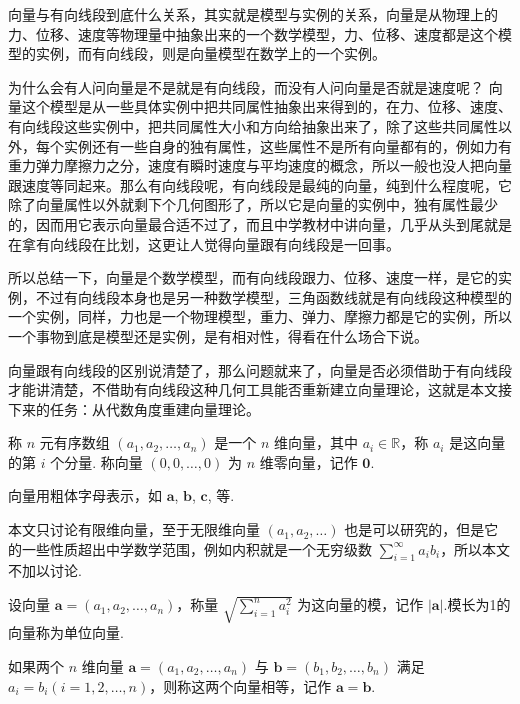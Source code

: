 向量与有向线段到底什么关系，其实就是模型与实例的关系，向量是从物理上的力、位移、速度等物理量中抽象出来的一个数学模型，力、位移、速度都是这个模型的实例，而有向线段，则是向量模型在数学上的一个实例。

为什么会有人问向量是不是就是有向线段，而没有人问向量是否就是速度呢？
向量这个模型是从一些具体实例中把共同属性抽象出来得到的，在力、位移、速度、有向线段这些实例中，把共同属性大小和方向给抽象出来了，除了这些共同属性以外，每个实例还有一些自身的独有属性，这些属性不是所有向量都有的，例如力有重力弹力摩擦力之分，速度有瞬时速度与平均速度的概念，所以一般也没人把向量跟速度等同起来。那么有向线段呢，有向线段是最纯的向量，纯到什么程度呢，它除了向量属性以外就剩下个几何图形了，所以它是向量的实例中，独有属性最少的，因而用它表示向量最合适不过了，而且中学教材中讲向量，几乎从头到尾就是在拿有向线段在比划，这更让人觉得向量跟有向线段是一回事。

所以总结一下，向量是个数学模型，而有向线段跟力、位移、速度一样，是它的实例，不过有向线段本身也是另一种数学模型，三角函数线就是有向线段这种模型的一个实例，同样，力也是一个物理模型，重力、弹力、摩擦力都是它的实例，所以一个事物到底是模型还是实例，是有相对性，得看在什么场合下说。

向量跟有向线段的区别说清楚了，那么问题就来了，向量是否必须借助于有向线段才能讲清楚，不借助有向线段这种几何工具能否重新建立向量理论，这就是本文接下来的任务：从代数角度重建向量理论。

\begin{definition}
  称 $n$ 元有序数组 $(a_1, a_2, \ldots, a_n)$ 是一个 $n$
  维向量，其中 $a_i \in \mathbb{R}$，称 $a_i$ 是这向量的第 $i$
  个分量. 称向量 $(0, 0, \ldots, 0)$ 为 $n$ 维零向量，记作
  $\bm{0}$.
\end{definition}

向量用粗体字母表示，如 $\bm{a}$, $\bm{b}$,
$\bm{c}$, 等.

本文只讨论有限维向量，至于无限维向量 $(a_1, a_2, \ldots)$
也是可以研究的，但是它的一些性质超出中学数学范围，例如内积就是一个无穷级数
$\sum_{i = 1}^{\infty} a_i b_i$，所以本文不加以讨论.

\begin{definition}
  设向量 $\bm{a}= (a_1, a_2, \ldots, a_n)$，称量 $\sqrt{\sum_{i =
  1}^n a_i^2}$ 为这向量的模，记作 $| \bm{a}
  |$.模长为1的向量称为单位向量.
\end{definition}

\begin{definition}
  如果两个 $n$ 维向量 $\bm{a}= (a_1, a_2 , \ldots, a_n)$
  与 $\bm{b}= (b_1, b_2, \ldots, b_n)$ 满足 $a_i = b_i (i = 1, 2,
  \ldots, n)$，则称这两个向量相等，记作
  $\bm{a}=\bm{b}$.
\end{definition}

